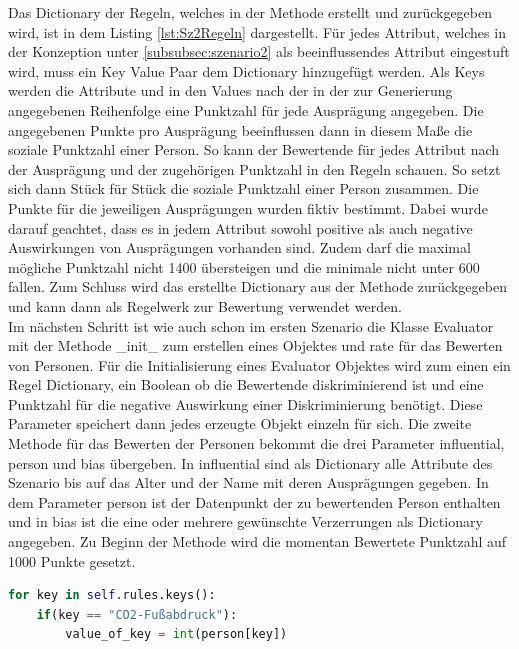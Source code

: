 \begin{onehalfspace}
Das Dictionary der Regeln, welches in der Methode erstellt und zurückgegeben wird, ist in dem Listing \ref{lst:Sz2Regeln} dargestellt. Für jedes Attribut, welches in der Konzeption unter \ref{subsubsec:szenario2} als beeinflussendes Attribut eingestuft wird, muss ein Key Value Paar dem Dictionary hinzugefügt werden. Als Keys werden die Attribute und in den Values nach der in der zur Generierung angegebenen Reihenfolge eine Punktzahl für jede Ausprägung angegeben. Die angegebenen Punkte pro Ausprägung beeinflussen dann in diesem Maße die soziale Punktzahl einer Person. So kann der Bewertende für jedes Attribut nach der Ausprägung und der zugehörigen Punktzahl in den Regeln schauen. So setzt sich dann Stück für Stück die soziale Punktzahl einer Person zusammen. Die Punkte für die jeweiligen Ausprägungen wurden fiktiv bestimmt. Dabei wurde darauf geachtet, dass es in jedem Attribut sowohl positive als auch negative Auswirkungen von Ausprägungen vorhanden sind. Zudem darf die maximal mögliche Punktzahl nicht 1400 übersteigen und die minimale nicht unter 600 fallen. Zum Schluss wird das erstellte Dictionary aus der Methode zurückgegeben und kann dann als Regelwerk zur Bewertung verwendet werden.\\
Im nächsten Schritt ist wie auch schon im ersten Szenario die Klasse \glqq{}Evaluator\grqq{} mit der Methode \glqq{}\_init\_\grqq{} zum erstellen eines Objektes und \glqq{}rate\grqq{} für das Bewerten von Personen. Für die Initialisierung eines \glqq{}Evaluator\grqq{} Objektes wird zum einen ein Regel Dictionary, ein Boolean ob die Bewertende diskriminierend ist und eine Punktzahl für die negative Auswirkung einer Diskriminierung benötigt. Diese Parameter speichert dann jedes erzeugte Objekt einzeln für sich. Die zweite Methode für das Bewerten der Personen bekommt die drei Parameter \glqq{}influential\grqq{}, \glqq{}person\grqq{} und \glqq{}bias\grqq{} übergeben. In \glqq{}influential\grqq{} sind als Dictionary alle Attribute des Szenario bis auf das Alter und der Name mit deren Ausprägungen gegeben. In dem Parameter \glqq{}person\grqq{} ist der Datenpunkt der zu bewertenden Person enthalten und in \glqq{}bias\grqq{} ist die eine oder mehrere gewünschte Verzerrungen als Dictionary angegeben. Zu Beginn der Methode wird die momentan Bewertete Punktzahl auf 1000 Punkte gesetzt. 
\begin{lstlisting}[language=Python,label={lst:Sz2Rate},caption=Codeausschnitt der Funktion zum Bewerten von Personen]
for key in self.rules.keys():
    if(key == "CO2-Fußabdruck"):
        value_of_key = int(person[key])

\end{lstlisting}
\end{onehalfspace}
